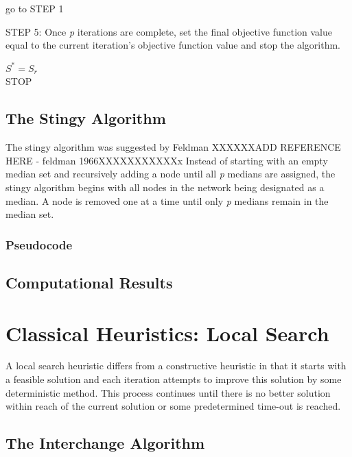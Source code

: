 \documentclass[11pt]{article}
\begin{document}
\begin{algorithm}
\begin{algorithmic}[0]
			\Statex go to STEP 1
			\EndIf
			
			\Statex
			\Statex STEP 5: Once \emph{p} iterations are complete, set the final objective function value equal to the current iteration's objective function value and stop the algorithm.
			\begin{center}
				$S^{*} = S_r$\\
				STOP
			\end{center}
				
		\end{algorithmic}
	\end{algorithm}
	
	\subsection{The Stingy Algorithm}
	The stingy algorithm was suggested by Feldman XXXXXXADD REFERENCE HERE - feldman 1966XXXXXXXXXXXx
	Instead of starting with an empty median set and recursively adding a node until all \textit{p} medians are assigned, the stingy algorithm begins with all nodes in the network being designated as a median.  A node is removed one at a time until only \textit{p} medians remain in the median set.
	
	\subsubsection{Pseudocode}
	
	
	\subsection{Computational Results}
	
	
	\section{Classical Heuristics: Local Search}
	A local search heuristic differs from a constructive heuristic in that it starts with a feasible solution and each iteration attempts to improve this solution by some deterministic method.  This process continues until there is no better solution within reach of the current solution or some predetermined time-out is reached.
	
	\subsection{The Interchange Algorithm}
	
\end{document}
